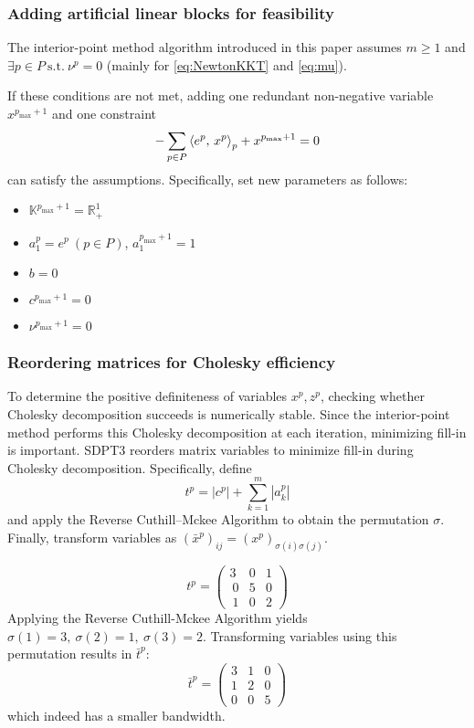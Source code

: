 \subsubsection{Adding artificial linear blocks for feasibility}

The interior-point method algorithm introduced in this paper assumes $m \geq 1$ and $\exists p\in P ~ \text{s.t.} ~ \nu^p=0$ (mainly for \eqref{eq:NewtonKKT} and \eqref{eq:mu}).

If these conditions are not met, adding one redundant non-negative variable $x^{p_{\max} + 1}$ and one constraint
\[
  -\sum_{p\in P} \left\langle e^p, \, x^p \right\rangle_p + x^{p_{\max} + 1} = 0
\]
can satisfy the assumptions.
Specifically, set new parameters as follows:
\begin{itemize}
    \item $\mathbb{K}^{p_{\max} + 1} = \mathbb{R}^1_+$
    \item $a^{p}_1=e^p ~ (p \in P)$, $a^{p_{\max} + 1}_1 = 1$
    \item $b = 0$
    \item $c^{p_{\max} +1}=0$
    \item $\nu^{p_{\max} + 1} = 0$
\end{itemize}

\subsubsection{Reordering matrices for Cholesky efficiency}
To determine the positive definiteness of variables $x^p, z^p$, checking whether Cholesky decomposition succeeds is numerically stable.
Since the interior-point method performs this Cholesky decomposition at each iteration, minimizing fill-in is important.
SDPT3 reorders matrix variables to minimize fill-in during Cholesky decomposition.
Specifically, define
\[
  t^p = |c^p| + \sum_{k=1}^m |a^p_k|
\]
and apply the Reverse Cuthill--Mckee Algorithm to obtain the permutation $\sigma$.
Finally, transform variables as $(\bar{x}^p)_{ij} = (x^p)_{\sigma(i)\sigma(j)}$.

\begin{example}
\[
    t^p = \begin{pmatrix}
        3 & 0 & 1 \\\
        0 & 5 & 0 \\\
        1 & 0 & 2
    \end{pmatrix}
\] Applying the Reverse Cuthill-Mckee Algorithm yields $\sigma(1)=3, ~ \sigma(2)=1, ~ \sigma(3)=2$.
Transforming variables using this permutation results in $\bar{t}^p$:
\[
    \bar{t}^p = \begin{pmatrix}
        3 & 1 & 0 \\
        1 & 2 & 0 \\
        0 & 0 & 5
    \end{pmatrix}
\]
which indeed has a smaller bandwidth.
\end{example}

